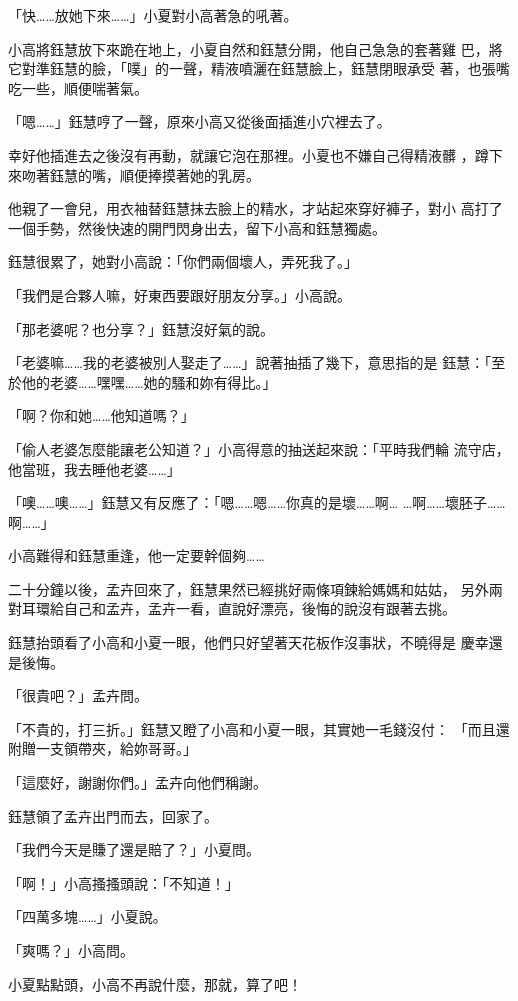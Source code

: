 「快……放她下來……」小夏對小高著急的吼著。

小高將鈺慧放下來跪在地上，小夏自然和鈺慧分開，他自己急急的套著雞
巴，將它對準鈺慧的臉，「噗」的一聲，精液噴灑在鈺慧臉上，鈺慧閉眼承受
著，也張嘴吃一些，順便喘著氣。

「嗯……」鈺慧哼了一聲，原來小高又從後面插進小穴裡去了。

幸好他插進去之後沒有再動，就讓它泡在那裡。小夏也不嫌自己得精液髒
，蹲下來吻著鈺慧的嘴，順便捧摸著她的乳房。

他親了一會兒，用衣袖替鈺慧抹去臉上的精水，才站起來穿好褲子，對小
高打了一個手勢，然後快速的開門閃身出去，留下小高和鈺慧獨處。

鈺慧很累了，她對小高說：「你們兩個壞人，弄死我了。」

「我們是合夥人嘛，好東西要跟好朋友分享。」小高說。

「那老婆呢？也分享？」鈺慧沒好氣的說。

「老婆嘛……我的老婆被別人娶走了……」說著抽插了幾下，意思指的是
鈺慧：「至於他的老婆……嘿嘿……她的騷和妳有得比。」

「啊？你和她……他知道嗎？」

「偷人老婆怎麼能讓老公知道？」小高得意的抽送起來說：「平時我們輪
流守店，他當班，我去睡他老婆……」

「噢……噢……」鈺慧又有反應了：「嗯……嗯……你真的是壞……啊…
…啊……壞胚子……啊……」

小高難得和鈺慧重逢，他一定要幹個夠……

二十分鐘以後，孟卉回來了，鈺慧果然已經挑好兩條項鍊給媽媽和姑姑，
另外兩對耳環給自己和孟卉，孟卉一看，直說好漂亮，後悔的說沒有跟著去挑。

鈺慧抬頭看了小高和小夏一眼，他們只好望著天花板作沒事狀，不曉得是
慶幸還是後悔。

「很貴吧？」孟卉問。

「不貴的，打三折。」鈺慧又瞪了小高和小夏一眼，其實她一毛錢沒付：
「而且還附贈一支領帶夾，給妳哥哥。」

「這麼好，謝謝你們。」孟卉向他們稱謝。

鈺慧領了孟卉出門而去，回家了。

「我們今天是賺了還是賠了？」小夏問。

「啊！」小高搔搔頭說：「不知道！」

「四萬多塊……」小夏說。

「爽嗎？」小高問。

小夏點點頭，小高不再說什麼，那就，算了吧！










